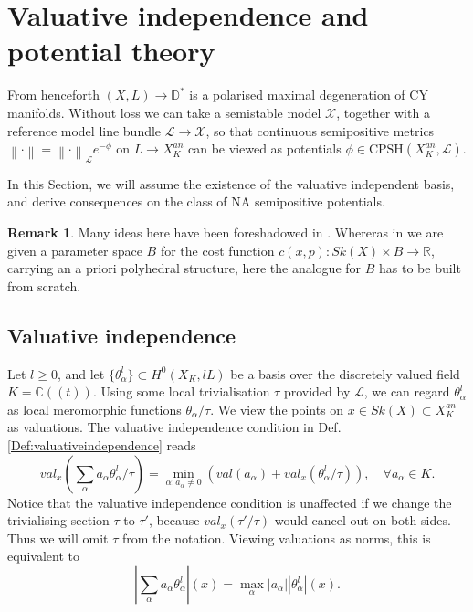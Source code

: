 \documentclass[a4paper]{article}
\theoremstyle{definition}
\newtheorem{rmk}[thm]{Remark}
\newcommand{\R}{\mathbb{R}}
\newcommand{\C}{\mathbb{C}}
\newcommand{\norm}[1]{\left\lVert#1\right\rVert}
\begin{document}
	
	
	
	\section{Valuative independence and potential theory}\label{sec:valuativeindependence}
	
	
	
From henceforth $(X,L)\to \mathbb{D}^*$ is a polarised maximal degeneration of CY manifolds. Without loss we can take a semistable model $\mathcal{X}$, together with a reference model line bundle $\mathcal{L}\to \mathcal{X}$, so that  continuous semipositive metrics $\norm{\cdot}= \norm{\cdot}_{\mathcal{L}} e^{-\phi}$ on $L\to X_K^{an}$ can be viewed as potentials $\phi\in \text{CPSH}(X_K^{an}, \mathcal{L})$.%
	
	
In this Section, we will assume the existence of  the valuative independent basis, and derive consequences on the class of NA semipositive potentials. 


\begin{rmk}
	Many ideas here have been foreshadowed in \cite[Section 5]{Litheta}. Whereras in \cite[Section 5]{Litheta} we are given a parameter space $B$ for the cost function $c(x,p): Sk(X)\times B\to \R$, carrying an a priori polyhedral structure, here the analogue for $B$ has to be built from scratch.
\end{rmk}

	
	
		
	\subsection{Valuative independence}\label{sect:valuativeindependence2}
	
	
	
	
	
	
	
	Let $l\geq 0$, and let $\{  \theta_\alpha^l \}\subset H^0(X_K, lL)$ be a basis over the discretely valued field $K=\C(\!(t)\!)$. Using some local trivialisation $\tau$ provided by $\mathcal{L}$, we can regard $\theta_\alpha^l$ as local meromorphic functions $\theta_\alpha/\tau$. We view the points on $x\in Sk(X)\subset X_K^{an}$ as valuations. The valuative independence condition in Def. \ref{Def:valuativeindependence} reads
	\[
		val_x(\sum_\alpha a_\alpha \theta^l_\alpha/\tau)= \min_{\alpha: a_\alpha\neq 0}  (val(a_\alpha) + val_x(\theta^l_\alpha/\tau) ),\quad \forall a_\alpha\in K.
\]
Notice that the valuative independence condition is unaffected if we change the trivialising section $\tau$ to $\tau'$, because $val_x(\tau'/\tau)$ would cancel out on both sides. Thus we will omit $\tau$ from the notation.
Viewing valuations as norms, this is equivalent to
	\begin{equation}
	| \sum_\alpha a_\alpha \theta_\alpha^l  | (x)=  \max_\alpha |a_\alpha |  |\theta_\alpha^l| (x).
	\end{equation}
	
\end{document}
